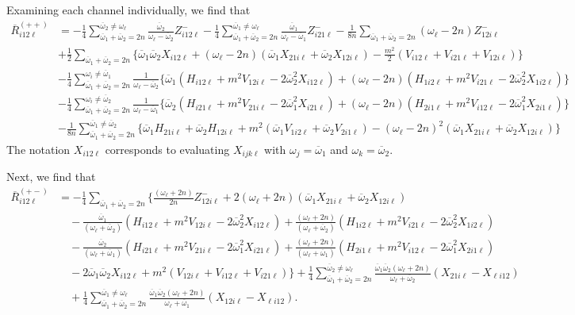 \documentclass[letterpaper,11pt]{article}
\newcommand{\oi}{\omega_i}
\newcommand{\ol}{\omega_\ell}
\newcommand{\oone}{\overline{\omega}_1}
\newcommand{\otwo}{\overline{\omega}_2}
\begin{document}
Examining each channel individually, we find that
\begin{align}
\label{R1}
\overline{R}^{(++)}_{i 1 2 \ell} &= - \frac{1}{4} \sum^{\otwo \neq \ol}_{\oone + \otwo = 2n} \frac{\otwo}{\ol - \otwo} Z^{-}_{i12\ell} - \frac{1}{4} \sum_{\oone+\otwo=2n}^{\oone \neq \ol} \frac{\oone}{\ol - \oone} Z^{-}_{i21\ell} - \frac{1}{8n} \sum_{\oone+\otwo = 2n}\!\!\!\! \left( \ol - 2n \right) Z^-_{12i\ell} \nonumber \\
%
& + \frac{1}{2} \sum_{\oone + \otwo = 2n} \Big\{ \oone\otwo X_{i12\ell} + \left( \ol - 2n \right)\left( \oone X_{21i\ell} + \otwo X_{12i\ell} \right) - \frac{m^2}{2} \left( V_{i12\ell} + V_{i21\ell} + V_{12i\ell} \right) \Big\} \nonumber \\
%
& - \frac{1}{4} \sum_{\oone + \otwo = 2n}^{\oi \neq \oone} \frac{1}{\ol - \otwo} \Big\{ \oone \left( H_{i12\ell} + m^2 V_{12i\ell} - 2 \otwo^2 X_{i12\ell} \right) + (\ol - 2n) \left( H_{1i2\ell} + m^2 V_{i21\ell} - 2\otwo^2 X_{1i2\ell} \right)\Big\} \nonumber \\
%
& - \frac{1}{4} \sum_{\oone + \otwo = 2n}^{\oi \neq \otwo} \frac{1}{\ol - \oone} \Big\{ \otwo \left( H_{i21\ell} + m^2 V_{21i\ell} - 2\oone^2 X_{i21\ell} \right) + (\ol - 2n) \left( H_{2i1\ell} + m^2 V_{i12\ell} - 2\oone^2 X_{2i1\ell} \right) \Big\} \nonumber \\
%
& - \frac{1}{8n} \sum_{\oone + \otwo = 2n}^{\oone \neq \otwo} \Big\{ \oone H_{21i\ell} + \otwo H_{12i\ell} + m^2 \left( \oone V_{1i2\ell} + \otwo V_{2i1\ell} \right) - \left( \ol - 2n \right)^2 \left(\oone X_{21i\ell} + \otwo X_{12i\ell} \right) \Big\}
\end{align}
The notation $X_{i12\ell}$ corresponds to evaluating $X_{ijk\ell}$ with $\omega_j = \oone$ and $\omega_k = \otwo$. 

Next, we find that
\begin{align}
\label{R2}
\overline{R}_{i12\ell}^{(+-)} &= - \frac{1}{4} \sum_{\oone + \otwo = 2n} \Big\{ \frac{(\ol + 2n)}{2n} Z^-_{12i\ell} + 2 (\ol + 2n) \left( \oone X_{21i\ell} + \otwo X_{12i\ell} \right) \nonumber \\
%
& \quad  -\frac{\oone}{(\ol + \otwo)} \left( H_{i12\ell} + m^2 V_{12i\ell} - 2 \otwo^2 X_{i12\ell} \right) + \frac{(\ol + 2n)}{(\ol + \otwo)} \left( H_{1i2\ell} + m^2 V_{i21\ell} - 2\otwo^2 X_{1i2\ell} \right)  \nonumber \\
%
& \quad - \frac{\otwo}{(\ol + \oone)} \left( H_{i21\ell} + m^2 V_{21i\ell} - 2\oone^2 X_{i21\ell} \right) + \frac{(\ol + 2n)}{(\ol + \oone)} \left(H_{2i1\ell} + m^2 V_{i12\ell} - 2\oone^2 X_{2i1\ell} \right)  \nonumber \\
%
& \quad  - 2 \oone\otwo X_{i12\ell} + m^2 \left( V_{12i\ell} + V_{i12\ell} + V_{i21\ell} \right) \Big\} + \frac{1}{4} \sum^{\otwo \neq \ol}_{\oone + \otwo = 2n} \frac{\oone\otwo(\ol + 2n)}{\ol + \otwo} \left( X_{21i\ell} - X_{\ell i 12} \right) \nonumber \\
%
& \quad + \frac{1}{4} \sum^{\oone \neq \ol}_{\oone + \otwo = 2n} \frac{\oone\otwo(\ol + 2n)}{\ol + \oone} \left( X_{12i\ell} - X_{\ell i 12} \right).
\end{align}
\end{document}
